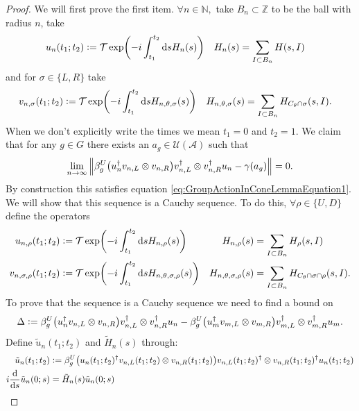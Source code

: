 \documentclass[12pt,a4paper,twoside]{article}
\renewcommand{\d}{\text{d}}
\newcommand{\defeq}{\vcentcolon=}
\let\originalleft\left
\let\originalright\right
\renewcommand{\left}{\mathopen{}\mathclose\bgroup\originalleft}
\renewcommand{\right}{\aftergroup\egroup\originalright}
\newcommand{\UU}{\mathcal U}
\newcommand{\ZZ}{\mathbb Z}
\renewcommand{\AA}{\mathcal A}
\newcommand{\NN}{\mathbb{N}}
\theoremstyle{definition}
\numberwithin{equation}{section}
\begin{document}
\begin{proof}
	We will first prove the first item.  $\forall n\in\NN,$ take $B_n\subset\ZZ$ to be the ball with radius $n$, take
	\begin{align}
		u_n(t_1;t_2)&\defeq \mathcal{T}\exp(-i\int_{t_1}^{t_2} \d s H_n(s))&H_n(s)&=\sum_{I\subset B_n}H(s,I)
	\end{align}
	and for $\sigma\in\{L,R\}$ take
	\begin{align}
		v_{n,\sigma}(t_1;t_2)&\defeq \mathcal{T}\exp(-i\int_{t_1}^{t_2} \d s H_{n,\theta,\sigma}(s))&H_{n,\theta,\sigma}(s)&=\sum_{I\subset B_n}H_{C_\theta\cap\sigma}(s,I).
	\end{align}
	When we don't explicitly write the times we mean $t_1=0$ and $t_2=1$. We claim that for any $g\in G$ there exists an $a_g\in\UU(\AA)$ such that
	\begin{equation}
		\lim_{n\rightarrow\infty}\norm{\beta_g^U\left(u_n^\dagger v_{n,L}\otimes v_{n,R}\right)v_{n,L}^\dagger\otimes v_{n,R}^\dagger u_{n}-\gamma(a_g)}=0.
	\end{equation}
	By construction this satisfies equation \eqref{eq:GroupActionInConeLemmaEquation1}. We will show that this sequence is a Cauchy sequence. To do this, $\forall\rho\in\{U,D\}$ define the operators
	\begin{align}
		u_{n,\rho}(t_1;t_2)&\defeq \mathcal{T}\exp(-i\int_{t_1}^{t_2} \d s H_{n,\rho}(s))&H_{n,\rho}(s)&=\sum_{I\subset B_n}H_\rho(s,I)\\
		v_{n,\sigma,\rho}(t_1;t_2)&\defeq \mathcal{T}\exp(-i\int_{t_1}^{t_2} \d s H_{n,\theta,\sigma,\rho}(s))&H_{n,\theta,\sigma,\rho}(s)&=\sum_{I\subset B_n}H_{C_\theta\cap\sigma\cap\rho}(s,I).
	\end{align}
	To prove that the sequence is a Cauchy sequence we need to find a bound on
	\begin{equation}
		\Delta\defeq \beta_g^U\left(u_n^\dagger v_{n,L}\otimes v_{n,R}\right)v_{n,L}^\dagger\otimes v_{n,R}^\dagger u_{n}-\beta_g^U\left(u_m^\dagger v_{m,L}\otimes v_{m,R}\right)v_{m,L}^\dagger\otimes v_{m,R}^\dagger u_{m}.
	\end{equation}
	Define $\tilde{u}_n(t_1;t_2)$ and $\tilde{H}_n(s)$ through:
	\begin{align}
		\tilde{u}_n(t_1;t_2)&\defeq \beta_g^U\left(u_n(t_1;t_2)^\dagger v_{n,L}(t_1;t_2)\otimes v_{n,R}(t_1;t_2)\right)v_{n,L}(t_1;t_2)^\dagger\otimes v_{n,R}(t_1;t_2)^\dagger u_{n}(t_1;t_2)\\
		i\frac{\d}{\d s}\tilde{u}_n(0;s)&=\tilde{H}_n(s)\tilde{u}_n(0;s)
	\end{align}

\end{proof}
\end{document}

